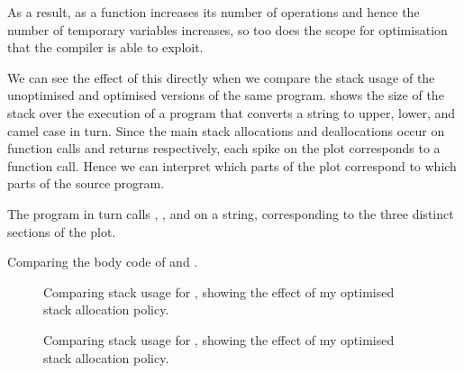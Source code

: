 \documentclass[00-main.tex]{subfiles}
\begin{document}
As a result, as a function increases its number of operations and hence the number of temporary variables increases, so too does the scope for optimisation that the compiler is able to exploit.

We can see the effect of this directly when we compare the stack usage of the unoptimised and optimised versions of the same program.
 shows the size of the stack over the execution of a program that converts a string to upper, lower, and camel case in turn.
Since the main stack allocations and deallocations occur on function calls and returns respectively, each spike on the plot corresponds to a function call.
Hence we can interpret which parts of the plot correspond to which parts of the source program.

The program in turn calls , , and  on a string, corresponding to the three distinct sections of the plot.

\begin{listing}[p]
  \hfill
  \par\smallskip
  \caption{Comparing the body code of  and .\bigskip}
  \label{lst:caseupper and casecamel body code}
\end{listing}

\begin{figure}[p]
  \centering
  \caption{Comparing stack usage for , showing the effect of my optimised stack allocation policy.}
  \label{fig:comparing stack usage for case.c} %
\end{figure}

\begin{figure}[p]
  \centering
  \caption{Comparing stack usage for , showing the effect of my optimised stack allocation policy.}
  \label{fig:comparing stack usage for fibonacci.c} %
\end{figure}
\end{document}
